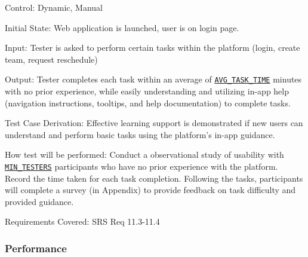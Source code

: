 \documentclass[12pt, titlepage]{article}
\begin{document}
\begin{enumerate}
Control: Dynamic, Manual
					
Initial State:  Web application is launched, user is on login page.
					
Input: Tester is asked to perform certain tasks within the platform (login, create team, request reschedule)
					
Output: Tester completes each task within an average of \hyperref[AVG_TASK_TIME]{\texttt{AVG\_TASK\_TIME}} minutes with no prior experience, while easily understanding and utilizing in-app help (navigation instructions, tooltips, and help documentation) to complete tasks.

Test Case Derivation: Effective learning support is demonstrated if new users can understand and perform basic tasks using the platform's in-app guidance.

How test will be performed: Conduct a observational study of usability with \hyperref[MIN_TESTERS]{\texttt{MIN\_TESTERS}} participants who have no prior experience with the platform. Record the time taken for each task completion. Following the tasks, participants will complete a survey (in Appendix) to provide feedback on task difficulty and provided guidance.

Requirements Covered: SRS Req 11.3-11.4

\end{enumerate}

\subsubsection{Performance}
\end{document}
